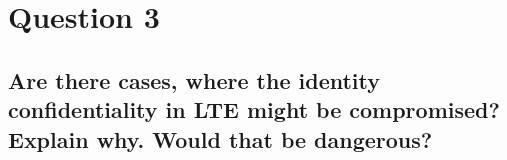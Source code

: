 \documentclass{report}
\begin{document}
	\section{Question 3}
	\startsection
		\renewcommand{\thesubsection}{\thesection.\Alph{subsection}}
		\subsection{Are there cases, where the identity confidentiality in LTE might be compromised? Explain why. Would that be dangerous?}
		\startsubsection
		\closesection
	\closesection
\end{document}
